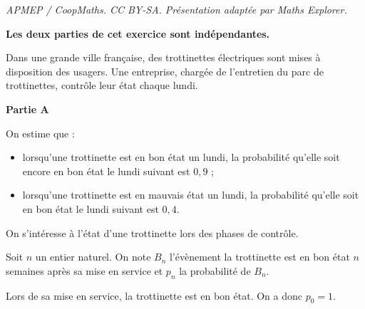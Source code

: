 \documentclass[10pt]{article}
\begin{document}
\noindent\textit{APMEP / CoopMaths. CC BY-SA. Présentation adaptée par Maths Explorer.}\par\medskip
\medskip

\textbf{Les deux parties de cet exercice sont indépendantes.}

\medskip

Dans une grande ville française, des trottinettes électriques sont mises à disposition des usagers. Une entreprise, chargée de l'entretien du parc de trottinettes, contrôle leur état chaque lundi.

\medskip

\textbf{Partie A}

\medskip

On estime que :
\begin{itemize}
\item lorsqu'une trottinette est en bon état un lundi, la probabilité qu'elle soit encore en bon état le lundi suivant est $0,9$ ;
\item lorsqu'une trottinette est en mauvais état un lundi, la probabilité qu'elle soit en bon état le lundi suivant est $0,4$.
\end{itemize}

\smallskip

On s'intéresse à l'état d'une trottinette lors des phases de contrôle.

Soit $n$ un entier naturel.
On note $B_n$ l'évènement \og la trottinette est en bon état $n$ semaines après sa mise en service\fg{} et $p_n$ la probabilité de $B_n$.

Lors de sa mise en service, la trottinette est en bon état. 
On a donc $p_0 = 1$.

\medskip
\end{document}
